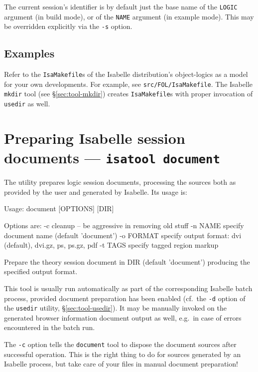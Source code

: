 The current session's identifier is by default just the base name of the
\texttt{LOGIC} argument (in build mode), or of the \texttt{NAME} argument (in
example mode). This may be overridden explicitly via the \texttt{-s} option.


\subsection*{Examples}

Refer to the \texttt{IsaMakefile}s of the Isabelle distribution's
object-logics as a model for your own developments.  For example, see
\texttt{src/FOL/IsaMakefile}.  The Isabelle \texttt{mkdir} tool (see
\S\ref{sec:tool-mkdir}) creates \texttt{IsaMakefile}s with proper invocation
of \texttt{usedir} as well.


\section{Preparing Isabelle session documents --- \texttt{isatool document}}
\label{sec:tool-document}

The  utility prepares logic session documents, processing the
sources both as provided by the user and generated by Isabelle.  Its usage is:
\begin{ttbox}
Usage: document [OPTIONS] [DIR]

  Options are:
    -c           cleanup -- be aggressive in removing old stuff
    -n NAME      specify document name (default 'document')
    -o FORMAT    specify output format: dvi (default), dvi.gz, ps,
                 ps.gz, pdf
    -t TAGS      specify tagged region markup

  Prepare the theory session document in DIR (default 'document')
  producing the specified output format.
\end{ttbox}
This tool is usually run automatically as part of the corresponding Isabelle
batch process, provided document preparation has been enabled (cf.\ the
\texttt{-d} option of the \texttt{usedir} utility, \S\ref{sec:tool-usedir}).
It may be manually invoked on the generated browser information document
output as well, e.g.\ in case of errors encountered in the batch run.

\medskip The \texttt{-c} option tells the \texttt{document} tool to dispose
the document sources after successful operation.  This is the right thing to
do for sources generated by an Isabelle process, but take care of your files
in manual document preparation!

